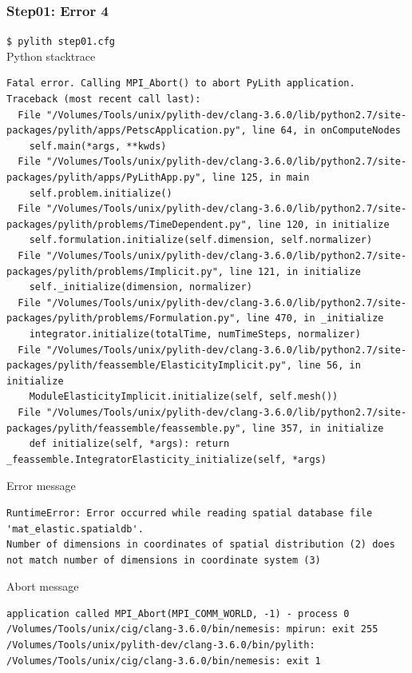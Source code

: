 \documentclass[aspectration=169]{beamer}
\newcommand{\cmd}[1]{{\footnotesize\tt \color{ltred}#1}}
\newcommand{\errlabel}[1]{{\small \color{blue}#1}}
\begin{document}
\begin{frame}[fragile]
  \frametitle{Step01: Error 4}

\cmd{\$ pylith step01.cfg}\\
\errlabel{Python stacktrace}
\begin{lstlisting}
Fatal error. Calling MPI_Abort() to abort PyLith application.
Traceback (most recent call last):
  File "/Volumes/Tools/unix/pylith-dev/clang-3.6.0/lib/python2.7/site-packages/pylith/apps/PetscApplication.py", line 64, in onComputeNodes
    self.main(*args, **kwds)
  File "/Volumes/Tools/unix/pylith-dev/clang-3.6.0/lib/python2.7/site-packages/pylith/apps/PyLithApp.py", line 125, in main
    self.problem.initialize()
  File "/Volumes/Tools/unix/pylith-dev/clang-3.6.0/lib/python2.7/site-packages/pylith/problems/TimeDependent.py", line 120, in initialize
    self.formulation.initialize(self.dimension, self.normalizer)
  File "/Volumes/Tools/unix/pylith-dev/clang-3.6.0/lib/python2.7/site-packages/pylith/problems/Implicit.py", line 121, in initialize
    self._initialize(dimension, normalizer)
  File "/Volumes/Tools/unix/pylith-dev/clang-3.6.0/lib/python2.7/site-packages/pylith/problems/Formulation.py", line 470, in _initialize
    integrator.initialize(totalTime, numTimeSteps, normalizer)
  File "/Volumes/Tools/unix/pylith-dev/clang-3.6.0/lib/python2.7/site-packages/pylith/feassemble/ElasticityImplicit.py", line 56, in initialize
    ModuleElasticityImplicit.initialize(self, self.mesh())
  File "/Volumes/Tools/unix/pylith-dev/clang-3.6.0/lib/python2.7/site-packages/pylith/feassemble/feassemble.py", line 357, in initialize
    def initialize(self, *args): return _feassemble.IntegratorElasticity_initialize(self, *args)
\end{lstlisting}
\errlabel{Error message}
\begin{lstlisting}
RuntimeError: Error occurred while reading spatial database file 'mat_elastic.spatialdb'.
Number of dimensions in coordinates of spatial distribution (2) does
not match number of dimensions in coordinate system (3)
\end{lstlisting}
\errlabel{Abort message}
\begin{lstlisting}
application called MPI_Abort(MPI_COMM_WORLD, -1) - process 0
/Volumes/Tools/unix/cig/clang-3.6.0/bin/nemesis: mpirun: exit 255
/Volumes/Tools/unix/pylith-dev/clang-3.6.0/bin/pylith: /Volumes/Tools/unix/cig/clang-3.6.0/bin/nemesis: exit 1
\end{lstlisting}

\end{frame}
\end{document}
